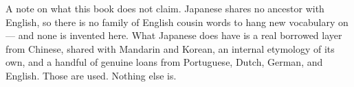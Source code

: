 \documentclass[11pt,twoside]{book}
\begin{document}
A note on what this book does not claim. Japanese shares no ancestor with
English, so there is no family of English cousin words to hang new vocabulary on
--- and none is invented here. What Japanese does have is a real borrowed layer
from Chinese, shared with Mandarin and Korean, an internal etymology of its own,
and a handful of genuine loans from Portuguese, Dutch, German, and English. Those
are used. Nothing else is.

\tableofcontents

\mainmatter


\end{document}

